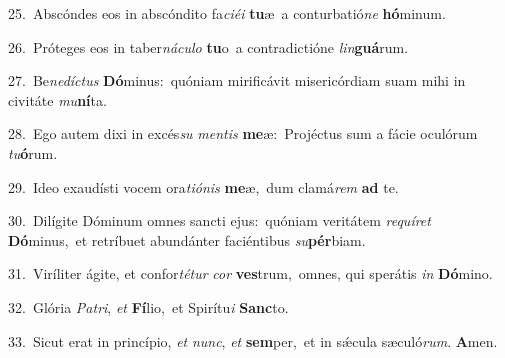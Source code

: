{\numbfont\textcolor{\numbcolor}{25.}}~Abscóndes eos in abscóndito fa\-\textit{ci}\-\textit{é}\textit{i} \textbf{tu}\-æ~\star a conturbatió\textit{ne} \textbf{hó}\-minum.\par
{\numbfont\textcolor{\numbcolor}{26.}}~Próteges eos in taber\-\textit{ná}\-\textit{cu}\textit{lo} \textbf{tu}\-o~\star a contradictióne \textit{lin}\-\textbf{guá}rum.\par
{\numbfont\textcolor{\numbcolor}{27.}}~Be\-\textit{ne}\-\textit{díc}\textit{tus} \textbf{Dó}\-minus:~\star quóniam mirificávit misericórdiam suam mihi in civitáte \textit{mu}\-\textbf{ní}ta.\par
{\numbfont\textcolor{\numbcolor}{28.}}~Ego autem dixi in excés\textit{su} \textit{men}\-\textit{tis} \textbf{me}\-æ:~\star Projéctus sum a fácie oculórum \textit{tu}\-\textbf{ó}rum.\par
{\numbfont\textcolor{\numbcolor}{29.}}~Ideo exaudísti vocem ora\-\textit{ti}\-\textit{ó}\textit{nis} \textbf{me}\-æ,~\star dum clamá\textit{rem} \textbf{ad} te.\par
{\numbfont\textcolor{\numbcolor}{30.}}~Dilígite Dóminum omnes sancti ejus:~\dagger quóniam veritátem \textit{re}\-\textit{quí}\textit{ret} \textbf{Dó}\-minus,~\star et retríbuet abundánter faciéntibus \textit{su}\-\textbf{pér}biam.\par
{\numbfont\textcolor{\numbcolor}{31.}}~Viríliter ágite, et confor\-\textit{té}\-\textit{tur} \textit{cor} \textbf{ves}\-trum,~\star omnes, qui sperátis \textit{in} \textbf{Dó}\-mino.\par
{\numbfont\textcolor{\numbcolor}{32.}}~Glória \textit{Pa}\-\textit{tri}, \textit{et} \textbf{Fí}\-lio,~\star et Spirítu\textit{i} \textbf{Sanc}\-to.\par
{\numbfont\textcolor{\numbcolor}{33.}}~Sicut erat in princípio, \textit{et} \textit{nunc}\-, \textit{et} \textbf{sem}\-per,~\star et in sǽcula sæculó\-\textit{rum}\-. \textbf{A}\-men.\par
